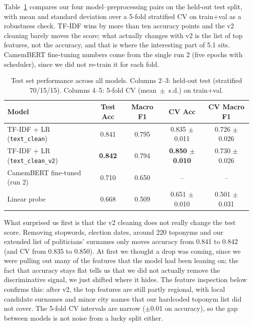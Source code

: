 \documentclass{article}
\begin{document}
Table~\ref{tab:results} compares our four model--preprocessing pairs on the held-out test split, with mean and standard deviation over a 5-fold stratified CV on train+val as a robustness check. TF-IDF wins by more than ten accuracy points and the v2 cleaning barely moves the score; what actually changes with v2 is the list of top features, not the accuracy, and that is where the interesting part of 5.1 sits. CamemBERT fine-tuning numbers come from the single run 2 (five epochs with scheduler), since we did not re-train it for each fold.

\begin{table}[h]
  \caption{Test set performance across all models. Columns 2--3: held-out test (stratified 70/15/15). Columns 4--5: 5-fold CV (mean~$\pm$~s.d.) on train+val.}
  \label{tab:results}
  \centering
  \small
  \begin{tabular}{lcccc}
    \toprule
    Model & Test Acc & Macro F1 & CV Acc & CV Macro F1 \\
    \midrule
    TF-IDF + LR (\texttt{text\_clean})     & 0.841 & 0.795 & 0.835 $\pm$ 0.011 & 0.726 $\pm$ 0.026 \\
    TF-IDF + LR (\texttt{text\_clean\_v2}) & \textbf{0.842} & 0.794 & \textbf{0.850 $\pm$ 0.010} & 0.730 $\pm$ 0.026 \\
    CamemBERT fine-tuned (run 2)            & 0.710 & 0.650 & --              & -- \\
    Linear probe                            & 0.668 & 0.509 & 0.651 $\pm$ 0.010 & 0.501 $\pm$ 0.031 \\
    \bottomrule
  \end{tabular}
\end{table}

What surprised us first is that the v2 cleaning does not really change the test score. Removing stopwords, election dates, around 220 toponyms and our extended list of politicians' surnames only moves accuracy from 0.841 to 0.842 (and CV from 0.835 to 0.850). At first we thought a drop was coming, since we were pulling out many of the features that the model had been leaning on; the fact that accuracy stays flat tells us that we did not actually remove the discriminative signal, we just shifted where it hides. The feature inspection below confirms this: after v2, the top features are still partly regional, with local candidate surnames and minor city names that our hardcoded toponym list did not cover. The 5-fold CV intervals are narrow ($\pm$0.01 on accuracy), so the gap between models is not noise from a lucky split either.
\end{document}
